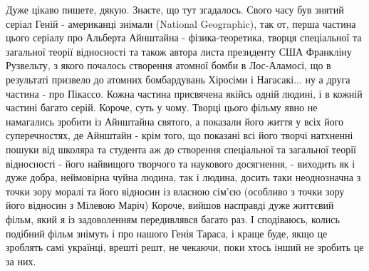  
 
 
 
 


Дуже цікаво пишете, дякую. Знаєте, що тут згадалось. Свого часу був знятий
серіал Геній - американці знімали (National Geographic), так от, перша частина
цього серіалу про Альберта Айнштайна - фізика-теоретика, творця спеціальної та
загальної теорії відносності та також автора листа президенту США Франкліну
Рузвельту, з якого почалось створення атомної бомби в Лос-Аламосі, що в
результаті призвело до атомних бомбардувань Хіросіми і Нагасакі... ну а друга
частина - про Пікассо. Кожна частина присвячена якійсь одній людині, і в кожній
частині багато серій. Короче, суть у чому. Творці цього фільму явно не
намагались зробити із Айнштайна святого, а показали його життя у всіх його
суперечностях, де Айнштайн - крім того, що показані всі його творчі натхненні
пошуки від школяра та студента аж до створення спеціальної та загальної теорії
відносності - його найвищого творчого та наукового досягнення, - виходить як і
дуже добра, неймовірна чуйна людина, так і людина, досить таки неоднозначна з
точки зору моралі та його відносин із власною сім'єю (особливо з точки зору
його відносин з Мілевою Маріч) Короче, вийшов насправді дуже життєвий фільм,
який я із задоволенням передивлявся багато раз. І сподіваюсь, колись подібний
фільм знімуть і про нашого Генія Тараса, і краще буде, якщо це зроблять самі
українці, врешті решт, не чекаючи, поки хтось інший не зробить це за них.
